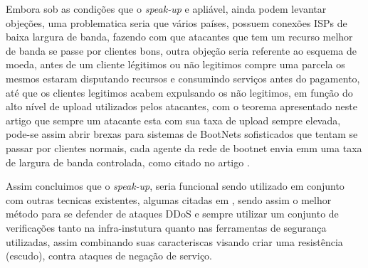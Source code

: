 \documentclass[a4paper,12pt]{article}
\begin{document}
 \vspace{0.3cm}
 
 
 Embora sob as condições que o \textit{speak-up} e apliável, ainda podem levantar objeções, uma problematica seria que vários países, possuem conexões ISPs de baixa largura de banda, fazendo com que atacantes que tem um recurso melhor de banda se passe por clientes bons, outra objeção seria referente ao esquema de moeda, antes de um cliente légitimos ou não legitimos compre uma parcela os mesmos estaram disputando recursos e consumindo serviços antes do pagamento, até que os clientes legitimos acabem expulsando os não legitimos, em função do alto nível de upload utilizados pelos atacantes, com o teorema apresentado neste artigo que sempre um atacante esta com sua taxa de upload sempre elevada, pode-se assim abrir brexas para sistemas de BootNets sofisticados que tentam se passar por clientes normais, cada agente da rede de bootnet envia emm uma taxa de largura de banda controlada, como citado no artigo \cite{7160662}.
\vspace{0.2cm}

 Assim concluimos que o \textit{speak-up}, seria funcional sendo utilizado em conjunto com outras tecnicas existentes, algumas citadas em \cite{7821722}, sendo assim  o melhor método para se defender de ataques DDoS e sempre utilizar um conjunto de verificações tanto na infra-instutura quanto nas ferramentas de segurança utilizadas, assim combinando suas caracteriscas visando criar uma resistência (escudo), contra ataques de negação de serviço.  
 
 
 
\vspace{2cm}


\begin{center}
\end{center}

 
\end{document}
